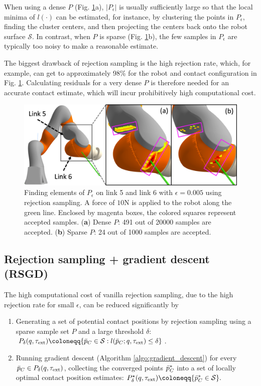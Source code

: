 When using a dense $P$ (Fig. \ref{fig:rejection_sampling}a), $|P_{\epsilon}|$ is usually sufficiently large so that the local minima of $l(\cdot)$ can be estimated, for instance, by clustering the points in $P_{\epsilon}$, finding the cluster centers, and then projecting the centers back onto the robot surface $\mathcal{S}$. In contrast, when $P$ is sparse (Fig. \ref{fig:rejection_sampling}b), the few samples in $P_{\epsilon}$ are typically too noisy to make a reasonable estimate. 

The biggest drawback of rejection sampling is the high rejection rate, which, for example, can get to approximately 98\% for the robot and contact configuration in Fig. \ref{fig:rejection_sampling}. Calculating residuals for a very dense $P$ is therefore needed for an accurate contact estimate, which will incur prohibitively high computational cost.
\begin{figure}[h]
    \centering
    \includegraphics[width=\linewidth]{figures/05_force_from_torque/rejection_sampling.png}
    \caption{Finding elements of $P_{\epsilon}$ on link 5 and link 6 with $\epsilon=0.005$ using rejection sampling. A force of $10\mathrm{N}$ is applied to the robot along the green line. Enclosed by magenta boxes, the colored squares represent accepted samples. (\textbf{a}) Dense $P$: 491 out of 20000 samples are accepted.  (\textbf{b}) Sparse $P$: 24 out of 1000 samples are accepted.}
    \label{fig:rejection_sampling}
    \vspace{-0.6cm}
\end{figure}

\subsection{Rejection sampling + gradient descent (RSGD)\label{sec:proposed_contact_estimator}}
The high computational cost of vanilla rejection sampling, due to the high rejection rate for small $\epsilon$, can be reduced significantly by
\begin{enumerate}
\item  Generating a set of potential contact positions by rejection sampling using a sparse sample set $P$ and a large threshold $\delta$: $P_{\delta}(q, \tauE) \coloneqq \{\pCbar \in \mathcal{S} : l(\pCbar; q, \tauE) \leq \delta\}$.

\item  Running gradient descent (Algorithm \ref{algo:gradient_descent}) for every $\bar{p}_C \in P_{\delta}(q, \tau_{\text{ext}})$, collecting the converged points $\bar{p}_C^*$ into a set of locally optimal contact position estimates: $P^\star_{\delta}(q, \tauE) \coloneqq \{\pCbar^* \in \mathcal{S}\}.$
\end{enumerate}

